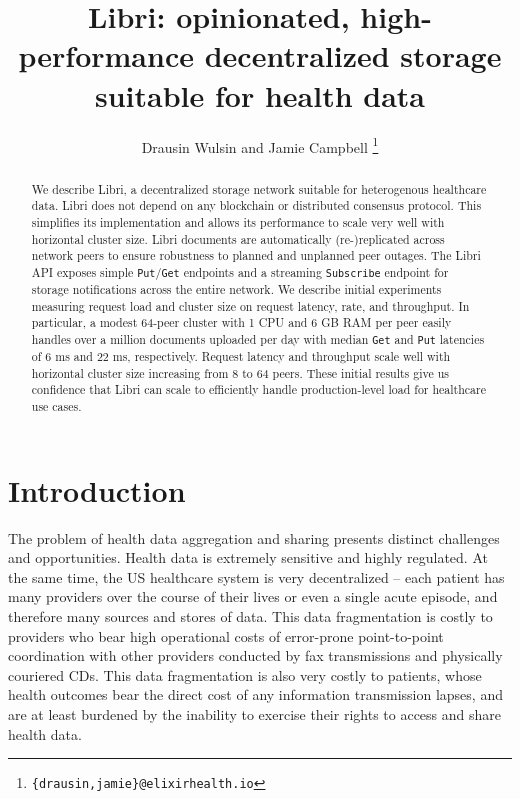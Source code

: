 \documentclass[10pt]{article}
\newcommand{\ttt}[1]{\texttt{#1}}
\def\Put{\ttt{Put}}
\def\Get{\ttt{Get}}
\begin{document}
\title{Libri: opinionated, high-performance decentralized storage suitable for health data}
\author{Drausin Wulsin and Jamie Campbell \thanks{\ttt{\{drausin,jamie\}@elixirhealth.io}}}
\maketitle

\begin{abstract}
We describe Libri, a decentralized storage network suitable for heterogenous healthcare data. Libri does not depend on any blockchain or distributed consensus protocol. This simplifies its implementation and allows its performance to scale very well with horizontal cluster size. Libri documents are automatically (re-)replicated across network peers to ensure robustness to planned and unplanned peer outages. The Libri API exposes simple \Put{}/\Get{} endpoints and a streaming \ttt{Subscribe} endpoint for storage notifications across the entire network. We describe initial experiments measuring request load and cluster size on request latency, rate, and throughput. In particular, a modest 64-peer cluster with 1 CPU and 6 GB RAM per peer easily handles over a million documents uploaded per day with median \Get{} and \Put{} latencies of 6 ms and 22 ms, respectively. Request latency and throughput scale well with horizontal cluster size increasing from 8 to 64 peers. These initial results give us confidence that Libri can scale to efficiently handle production-level load for healthcare use cases.
\end{abstract}

\section{Introduction}

The problem of health data aggregation and sharing presents distinct challenges and opportunities. Health data is extremely sensitive and highly regulated. At the same time, the US healthcare system is very decentralized -- each patient has many providers over the course of their lives or even a single acute episode, and therefore many sources and stores of data. This data fragmentation is costly to providers who bear high operational costs of error-prone point-to-point coordination with other providers conducted by fax transmissions and physically couriered CDs. This data fragmentation is also very costly to patients, whose health outcomes bear the direct cost of any information transmission lapses, and are at least burdened by the inability to exercise their rights to access and share health data.
\end{document}
